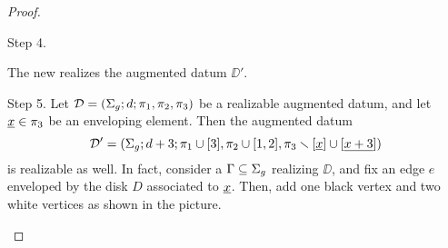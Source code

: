 \begin{proof}
\begin{sideline}{Step 4.}
\begin{center}
\end{center}
The new \dessin{} realizes the augmented datum $\DD'$.
\end{sideline}

\def\picturesetup{
\begin{pgfonlayer}{graph edge below}
\begin{scope}
\clip (-.8,0) to[bend left=90,looseness=1.5] (.8,0) to[bend left=90] (-.8,0);
\fill[disk 1] circle(3);
\draw[disk 1 boundary enveloped,line width=\edgelinewidth] (-.5,0) pic{black vertex} to (.5,0) pic {white vertex};
\path[black edge] (-.5,0) to (-1,0);
\path[black edge] (.5,0) to (1,0);
\end{scope}
\end{pgfonlayer}
}
\begin{sideline}{Step 5.}
Let $\mathcal{D}=(\Sigma_{g};d;\pi_1,\pi_2,\pi_3)$ be a realizable augmented datum, and let $\underline{x}\in\pi_3$ be an enveloping element. Then the augmented datum
\[
\mathcal{D}'=(\Sigma_{g};d+3;\pi_1\cup[3],\pi_2\cup[1,2],\pi_3\smallsetminus[\underline{x}]\cup[\underline{x+3}])
\]
is realizable as well. In fact, consider a \dessin{} $\Gamma\subseteq\Sigma_{g}$ realizing $\DD$, and fix an edge $e$ enveloped by the disk $D$ associated to $\underline{x}$. Then, add one black vertex and two white vertices as shown in the picture.
\begin{center}
\end{center}
\end{sideline}
\end{proof}
